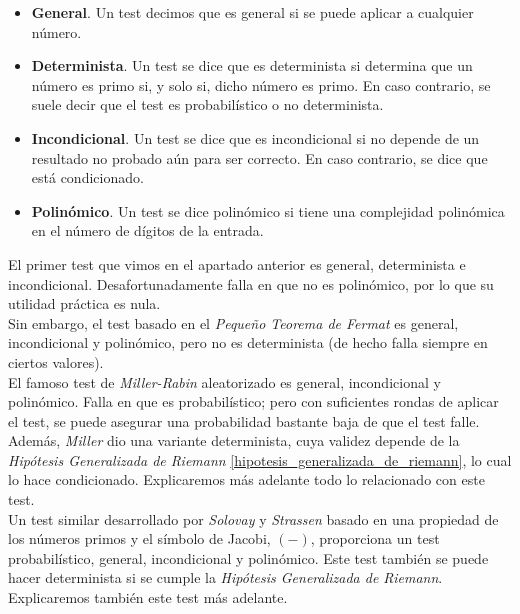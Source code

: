 \begin{itemize}
	\item \textbf{General}. Un test decimos que es general si se puede aplicar a cualquier número.
	
	\item \textbf{Determinista}. Un test se dice que es determinista si determina que un número es primo si, y solo si, dicho número es primo. En caso contrario, se suele decir que el test es probabilístico o no determinista.
	
	\item \textbf{Incondicional}. Un test se dice que es incondicional si no depende de un resultado no probado aún para ser correcto. En caso contrario, se dice que está condicionado.
	
	\item \textbf{Polinómico}. Un test se dice polinómico si tiene una complejidad polinómica en el número de dígitos de la entrada.
\end{itemize}

El primer test que vimos en el apartado anterior es general, determinista e incondicional. Desafortunadamente falla en que no es polinómico, por lo que su utilidad práctica es nula.\\

Sin embargo, el test basado en el \textit{Pequeño Teorema de Fermat} es general, incondicional y polinómico, pero no es determinista (de hecho falla siempre en ciertos valores).\\

El famoso test de \textit{Miller-Rabin} aleatorizado es general, incondicional y polinómico. Falla en que es probabilístico; pero con suficientes rondas de aplicar el test, se puede asegurar una probabilidad bastante baja de que el test falle. Además, \textit{Miller} dio una variante determinista, cuya validez depende de la \textit{Hipótesis Generalizada de Riemann} \ref{hipotesis_generalizada_de_riemann}, lo cual lo hace condicionado. Explicaremos más adelante todo lo relacionado con este test.\\

Un test similar desarrollado por \textit{Solovay} y \textit{Strassen} basado en una propiedad de los números primos y el símbolo de Jacobi, $(-)$, proporciona un test probabilístico, general, incondicional y polinómico. Este test también se puede hacer determinista si se cumple la \textit{Hipótesis Generalizada de Riemann}. Explicaremos también este test más adelante.\\

